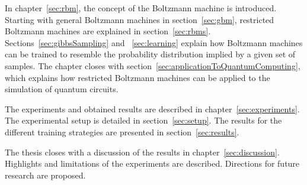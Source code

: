 In chapter~\ref{sec:rbm}, the concept of the Boltzmann machine is introduced. 
Starting with general Boltzmann machines in section~\ref{sec:gbm}, restricted 
Boltzmann machines are explained in section~\ref{sec:rbms}.
Sections~\ref{sec:gibbsSampling} and ~\ref{sec:learning} explain how 
Boltzmann machines can be trained to resemble the probability distribution implied by a given set of samples.
The chapter closes with section~\ref{sec:applicationToQuantumComputing}, which explains
how restricted Boltzmann machines can be applied to the simulation of quantum circuits.

The experiments and obtained results are described in chapter~\ref{sec:experiments}. 
The experimental setup is detailed in section~\ref{sec:setup}. The results 
for the different training strategies are presented in section~\ref{sec:results}.

The thesis closes with a discussion of the results in chapter~\ref{sec:discussion}.
Highlights and limitations of the experiments are described. 
Directions for future research are proposed.


